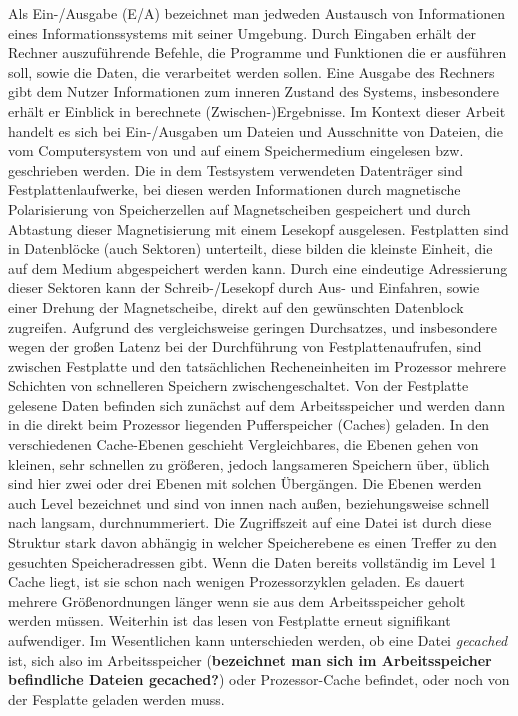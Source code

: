 \documentclass[
	12pt,
	a4paper,
	BCOR10mm,
	DIV14,
	listof=totoc,
	bibliography=totoc,
	headsepline
]{scrreprt}
\begin{document}
Als Ein-/Ausgabe (E/A) bezeichnet man jedweden Austausch von Informationen eines Informationssystems mit seiner Umgebung. Durch Eingaben erhält der Rechner auszuführende Befehle, die Programme und Funktionen die er ausführen soll, sowie die Daten, die verarbeitet werden sollen. Eine Ausgabe des Rechners gibt dem Nutzer Informationen zum inneren Zustand des Systems, insbesondere erhält er Einblick in berechnete (Zwischen-)Ergebnisse.  
Im Kontext dieser Arbeit handelt es sich bei Ein-/Ausgaben um Dateien und Ausschnitte von Dateien, die vom Computersystem von und auf einem Speichermedium eingelesen bzw. geschrieben werden.
Die in dem Testsystem verwendeten Datenträger sind Festplattenlaufwerke, bei diesen werden Informationen durch magnetische Polarisierung von Speicherzellen auf Magnetscheiben gespeichert und durch Abtastung dieser Magnetisierung mit einem Lesekopf ausgelesen.
Festplatten sind in Datenblöcke (auch Sektoren) unterteilt, diese bilden die kleinste Einheit, die auf dem Medium abgespeichert werden kann. Durch eine eindeutige Adressierung dieser Sektoren kann der Schreib-/Lesekopf durch Aus- und Einfahren, sowie einer Drehung der Magnetscheibe, direkt auf den gewünschten Datenblock zugreifen.
Aufgrund des vergleichsweise geringen Durchsatzes, und insbesondere wegen der großen Latenz bei der Durchführung von Festplattenaufrufen, sind zwischen Festplatte und den tatsächlichen Recheneinheiten im Prozessor mehrere Schichten von schnelleren Speichern zwischengeschaltet.
Von der Festplatte gelesene Daten befinden sich zunächst auf dem Arbeitsspeicher und werden dann in die direkt beim Prozessor liegenden Pufferspeicher (Caches) geladen. In den verschiedenen Cache-Ebenen geschieht Vergleichbares, die Ebenen gehen von kleinen, sehr schnellen zu größeren, jedoch langsameren Speichern über, üblich sind hier zwei oder drei Ebenen mit solchen Übergängen. Die Ebenen werden auch Level bezeichnet und sind von innen nach außen, beziehungsweise schnell nach langsam, durchnummeriert. 
Die Zugriffszeit auf eine Datei ist durch diese Struktur stark davon abhängig in welcher Speicherebene es einen Treffer zu den gesuchten Speicheradressen gibt. Wenn die Daten bereits vollständig im Level 1 Cache liegt, ist sie schon nach wenigen Prozessorzyklen geladen. Es dauert mehrere Größenordnungen länger wenn sie aus dem Arbeitsspeicher geholt werden müssen. Weiterhin ist das lesen von Festplatte erneut signifikant aufwendiger. Im Wesentlichen kann unterschieden werden, ob eine Datei \textit{gecached} ist, sich also im Arbeitsspeicher (\textbf{bezeichnet man sich im Arbeitsspeicher befindliche Dateien gecached?}) oder Prozessor-Cache befindet, oder noch von der Fesplatte geladen werden muss.
\end{document}

